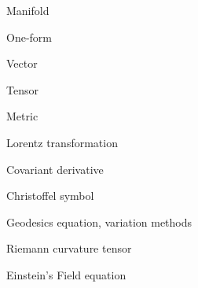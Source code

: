 \documentclass[main]{subfiles}
\begin{document}
\begin{multicols}{2}

Manifold

One-form

Vector

Tensor

Metric

Lorentz transformation

Covariant derivative

Christoffel symbol

Geodesics equation, variation methods

Riemann curvature tensor

Einstein's Field equation


\end{multicols}
\end{document}
